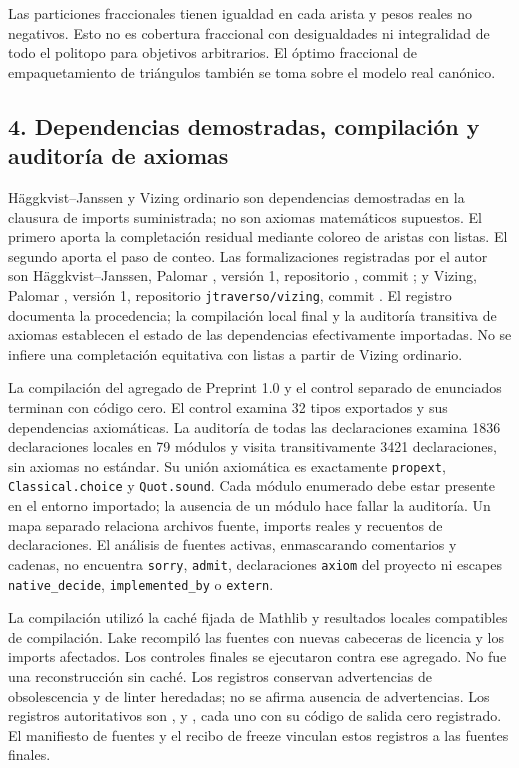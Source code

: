 \documentclass[spanish,11pt,a4paper]{article}
\begin{document}
Las particiones fraccionales tienen igualdad en cada arista y pesos
reales no negativos. Esto no es cobertura fraccional con desigualdades
ni integralidad de todo el politopo para objetivos arbitrarios. El
óptimo fraccional de empaquetamiento de triángulos también se toma sobre
el modelo real canónico.

\subsection{4. Dependencias demostradas, compilación y auditoría de
axiomas}\label{dependencias-demostradas-compilaciuxf3n-y-auditoruxeda-de-axiomas}

Häggkvist--Janssen y Vizing ordinario son dependencias demostradas en la
clausura de imports suministrada; no son axiomas matemáticos supuestos.
El primero aporta la completación residual mediante coloreo de aristas
con listas. El segundo aporta el paso de conteo. Las formalizaciones
registradas por el autor son Häggkvist--Janssen, Palomar
, versión 1, repositorio
, commit
; y Vizing, Palomar
, versión 1, repositorio
\texttt{jtraverso/vizing}, commit
. El registro documenta
la procedencia; la compilación local final y la auditoría transitiva de
axiomas establecen el estado de las dependencias efectivamente
importadas. No se infiere una completación equitativa con listas a
partir de Vizing ordinario.

La compilación del agregado de Preprint 1.0 y el control separado de
enunciados terminan con código cero. El control examina 32 tipos
exportados y sus dependencias axiomáticas. La auditoría de todas las
declaraciones examina 1836 declaraciones locales en 79 módulos y visita
transitivamente 3421 declaraciones, sin axiomas no estándar. Su unión
axiomática es exactamente \texttt{propext}, \texttt{Classical.choice} y
\texttt{Quot.sound}. Cada módulo enumerado debe estar presente en el
entorno importado; la ausencia de un módulo hace fallar la auditoría. Un
mapa separado relaciona archivos fuente, imports reales y recuentos de
declaraciones. El análisis de fuentes activas, enmascarando comentarios
y cadenas, no encuentra \texttt{sorry}, \texttt{admit}, declaraciones
\texttt{axiom} del proyecto ni escapes \texttt{native\_decide},
\texttt{implemented\_by} o \texttt{extern}.

La compilación utilizó la caché fijada de Mathlib y resultados locales
compatibles de compilación. Lake recompiló las fuentes con nuevas
cabeceras de licencia y los imports afectados. Los controles finales se
ejecutaron contra ese agregado. No fue una reconstrucción sin caché. Los
registros conservan advertencias de obsolescencia y de linter heredadas;
no se afirma ausencia de advertencias. Los registros autoritativos son
,
 y
, cada uno con su código
de salida cero registrado. El manifiesto de fuentes y el recibo de
freeze vinculan estos registros a las fuentes finales.
\end{document}
